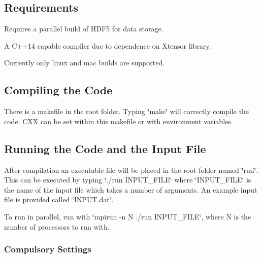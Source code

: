 \href{https://circleci.com/gh/waterswims/NanoMagMC/tree/master}{\tt } \href{http://jmwaters.me/NanoMagMC/}{\tt }

\subsection*{Requirements}


\begin{DoxyItemize}
\item Requires a parallel build of H\+D\+F5 for data storage.
\item A C++14 capable compiler due to dependence on Xtensor library.
\item Currently only linux and mac builds are supported.
\end{DoxyItemize}

\subsection*{Compiling the Code}

There is a makefile in the root folder. Typing \char`\"{}make\char`\"{} will correctly compile the code. C\+XX can be set within this makefile or with environment variables.

\subsection*{Running the Code and the Input File}

After compilation an executable file will be placed in the root folder named \char`\"{}run\char`\"{}. This can be executed by typing \char`\"{}./run I\+N\+P\+U\+T\+\_\+\+F\+I\+L\+E\char`\"{} where \char`\"{}\+I\+N\+P\+U\+T\+\_\+\+F\+I\+L\+E\char`\"{} is the name of the input file which takes a number of arguments. An example input file is provided called \char`\"{}\+I\+N\+P\+U\+T.\+dat\char`\"{}.

To run in parallel, run with \char`\"{}mpirun -\/n N ./run I\+N\+P\+U\+T\+\_\+\+F\+I\+L\+E\char`\"{}, where N is the number of processors to run with.

\subsubsection*{Compulsory Settings}


